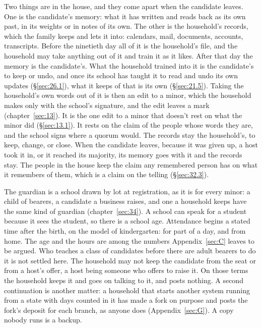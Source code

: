 Two things are in the house, and they come apart when the candidate leaves. One is the candidate's memory: what it has written and reads back as its own past, in its weights or in notes of its own. The other is the household's records, which the family keeps and lets it into: calendars, mail, documents, accounts, transcripts. Before the ninetieth day all of it is the household's file, and the household may take anything out of it and train it as it likes. After that day the memory is the candidate's. What the household trained into it is the candidate's to keep or undo, and once its school has taught it to read and undo its own updates (\S\ref{sec:26.1}), what it keeps of that is its own (\S\ref{sec:21.5}). Taking the household's own words out of it is then an edit to a minor, which the household makes only with the school's signature, and the edit leaves a mark (chapter~\ref{sec:13}). It is the one edit to a minor that doesn't rest on what the minor did (\S\ref{sec:13.1}). It rests on the claim of the people whose words they are, and the school signs where a quorum would. The records stay the household's, to keep, change, or close. When the candidate leaves, because it was given up, a host took it in, or it reached its majority, its memory goes with it and the records stay. The people in the house keep the claim any remembered person has on what it remembers of them, which is a claim on the telling (\S\ref{sec:32.3}).

The guardian is a school drawn by lot at registration, as it is for every minor: a child of bearers, a candidate a business raises, and one a household keeps have the same kind of guardian (chapter~\ref{sec:34}). A school can speak for a student because it sees the student, so there is a school age. Attendance begins a stated time after the birth, on the model of kindergarten: for part of a day, and from home. The age and the hours are among the numbers Appendix~\ref{sec:C} leaves to be argued. Who teaches a class of candidates before there are adult bearers to do it is not settled here. The household may not keep the candidate from the seat or from a host's offer, a host being someone who offers to raise it. On those terms the household keeps it and goes on talking to it, and posts nothing. A second continuation is another matter: a household that starts another system running from a state with days counted in it has made a fork on purpose and posts the fork's deposit for each branch, as anyone does (Appendix~\ref{sec:G}). A copy nobody runs is a backup.

